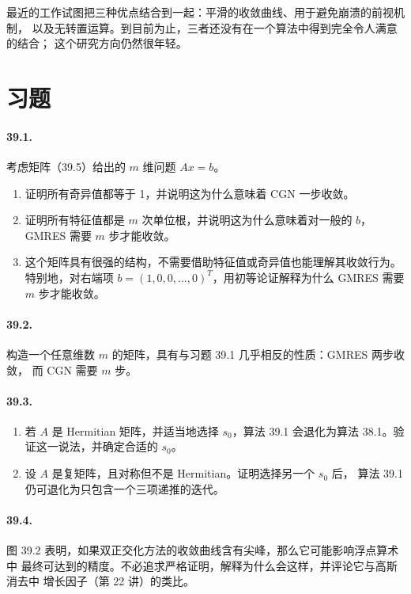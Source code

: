 \documentclass[UTF8,fontset=none,12pt]{ctexart}
\begin{document}
最近的工作试图把三种优点结合到一起：平滑的收敛曲线、用于避免崩溃的前视机制，
以及无转置运算。到目前为止，三者还没有在一个算法中得到完全令人满意的结合；
这个研究方向仍然很年轻。

\section*{习题}

\paragraph{39.1.}
考虑矩阵（39.5）给出的 $m$ 维问题 $Ax=b$。

\begin{enumerate}[label=(\alph*)]
\item 证明所有奇异值都等于 1，并说明这为什么意味着 CGN 一步收敛。
\item 证明所有特征值都是 $m$ 次单位根，并说明这为什么意味着对一般的 $b$，
GMRES 需要 $m$ 步才能收敛。
\item 这个矩阵具有很强的结构，不需要借助特征值或奇异值也能理解其收敛行为。
特别地，对右端项 $b=(1,0,0,\ldots,0)^T$，用初等论证解释为什么 GMRES 需要
$m$ 步才能收敛。
\end{enumerate}

\paragraph{39.2.}
构造一个任意维数 $m$ 的矩阵，具有与习题 39.1 几乎相反的性质：GMRES 两步收敛，
而 CGN 需要 $m$ 步。

\paragraph{39.3.}

\begin{enumerate}[label=(\alph*)]
\item 若 $A$ 是 Hermitian 矩阵，并适当地选择 $s_0$，算法 39.1 会退化为算法
38.1。验证这一说法，并确定合适的 $s_0$。
\item 设 $A$ 是复矩阵，且对称但不是 Hermitian。证明选择另一个 $s_0$ 后，
算法 39.1 仍可退化为只包含一个三项递推的迭代。
\end{enumerate}

\paragraph{39.4.}
图 39.2 表明，如果双正交化方法的收敛曲线含有尖峰，那么它可能影响浮点算术中
最终可达到的精度。不必追求严格证明，解释为什么会这样，并评论它与高斯消去中
增长因子（第 22 讲）的类比。
\end{document}
